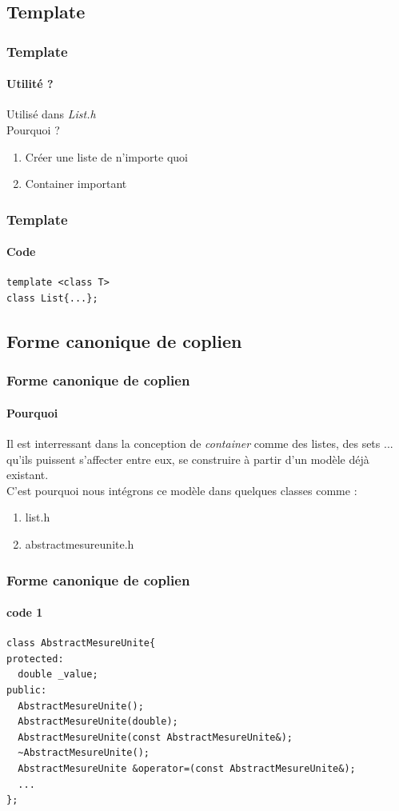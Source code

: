 \documentclass[10pt]{beamer}
\begin{document}
\subsection{Template}

\begin{frame}
  \frametitle{Template}
  \framesubtitle{Utilité ?}
  Utilisé dans \emph{List.h}\\

  Pourquoi ?
  \begin{enumerate}
    \item Créer une liste de n'importe quoi
    \item Container important
  \end{enumerate}
\end{frame}

\begin{frame}[fragile]
  \frametitle{Template}
  \framesubtitle{Code}
  \begin{verbatim}
template <class T>
class List{...};
  \end{verbatim}
\end{frame}

  \subsection{Forme canonique de coplien}
\begin{frame}[fragile]
  \frametitle{Forme canonique de coplien}
  \framesubtitle{Pourquoi}

  Il est interressant dans la conception de \emph{container} comme des listes, des sets ... qu'ils puissent s'affecter entre eux, se construire à partir d'un modèle déjà existant.\\

  C'est pourquoi nous intégrons ce modèle dans quelques classes comme :
  \begin{enumerate}
    \item list.h
    \item abstractmesureunite.h
  \end{enumerate}
\end{frame}

\begin{frame}[fragile]
  \frametitle{Forme canonique de coplien}
  \framesubtitle{code 1}

  \begin{verbatim}
class AbstractMesureUnite{
protected:
  double _value;
public:
  AbstractMesureUnite();
  AbstractMesureUnite(double);
  AbstractMesureUnite(const AbstractMesureUnite&);
  ~AbstractMesureUnite();
  AbstractMesureUnite &operator=(const AbstractMesureUnite&);
  ...
};
  \end{verbatim}
\end{frame}
\end{document}
